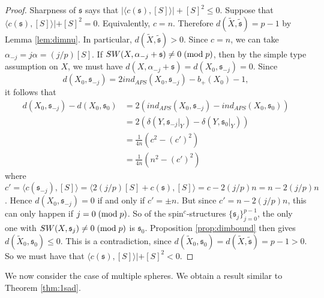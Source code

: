 \documentclass{amsart}
\theoremstyle{definition}
\theoremstyle{remark}
\numberwithin{equation}{section}
\begin{document}
\begin{proof}
Sharpness of $\mathfrak{s}$ says that $|\langle c(\mathfrak{s}) , [S] \rangle| + [S]^2 \le 0$. Suppose that $\langle c(\mathfrak{s}) , [S] \rangle | + [S]^2 = 0$. Equivalently, $c=n$. Therefore $d(\widetilde{X} , \widetilde{\mathfrak{s}}) = p-1$ by Lemma \ref{lem:dimnu}. In particular, $d(\widetilde{X} , \widetilde{\mathfrak{s}}) > 0$. Since $c = n$, we can take $\alpha_{-j} = j\alpha = (j/p)[S]$. If $SW(X , \alpha_{-j} + \mathfrak{s}) \neq 0 \; ({\rm mod} \; p)$, then by the simple type assumption on $X$, we must have $d(X , \alpha_{-j} + \mathfrak{s}) = d(X_0 , \mathfrak{s}_{-j}) = 0$. Since
\[
d(X_0 , \mathfrak{s}_{-j}) = 2 ind_{APS}(X_0 , \mathfrak{s}_{-j}) - b_+(X_0) - 1,
\]
it follows that
\begin{align*}
d(X_0 , \mathfrak{s}_{-j}) - d(X_0 , \mathfrak{s}_0) &= 2( ind_{APS}(X_0 , \mathfrak{s}_{-j}) - ind_{APS}(X_0 , \mathfrak{s}_0) ) \\
&= 2( \delta( Y , \mathfrak{s}_{-j} |_Y ) - \delta( Y , \mathfrak{s}_0 |_Y ) ) \\
&= \frac{1}{4n}\left( c^2 - (c')^2  \right) \\
&= \frac{1}{4n}\left( n^2 - (c')^2 \right)
\end{align*}
where $c' = \langle c(\mathfrak{s}_{-j}) , [S] \rangle = \langle 2 (j/p)[S] + c(\mathfrak{s}) , [S] \rangle = c - 2(j/p)n = n - 2(j/p)n$. Hence $d(X_0 , \mathfrak{s}_{-j}) = 0$ if and only if $c' = \pm n$. But since $c' = n - 2(j/p)n$, this can only happen if $j = 0 \; ({\rm mod} \; p)$. So of the spin$^c$-structures $\{ \mathfrak{s}_j \}_{j=0}^{p-1}$, the only one with $SW(X , \mathfrak{s}_j ) \neq 0 \; ({\rm mod} \; p)$ is $\mathfrak{s}_0$. Proposition \ref{prop:dimbound} then gives $d(\widetilde{X}_0 , \mathfrak{s}_0) \le 0$. This is a contradiction, since $d(\widetilde{X}_0 , \mathfrak{s}_0) = d(\widetilde{X} , \widetilde{\mathfrak{s}}) = p-1 > 0$. So we must have that $\langle c(\mathfrak{s}) , [S] \rangle | + [S]^2 < 0$.

\end{proof}

We now consider the case of multiple spheres. We obtain a result similar to Theorem \ref{thm:1sad}.
\end{document}
